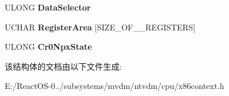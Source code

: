 \begin{DoxyCompactItemize}
U\+L\+O\+NG {\bfseries Data\+Selector}
\item 
\mbox{\label{struct___x87_f_l_o_a_t_i_n_g___s_a_v_e___a_r_e_a_a7ef3ca6bc7bd95fa032f0b3e6d0dd6bd}} 
U\+C\+H\+AR {\bfseries Register\+Area} \mbox{[}S\+I\+Z\+E\+\_\+\+O\+F\+\_\+\_\+\+R\+E\+G\+I\+S\+T\+E\+RS\mbox{]}
\item 
\mbox{\label{struct___x87_f_l_o_a_t_i_n_g___s_a_v_e___a_r_e_a_a5f188dba56de26be2fcdccbf6df14b03}} 
U\+L\+O\+NG {\bfseries Cr0\+Npx\+State}
\end{DoxyCompactItemize}


该结构体的文档由以下文件生成\+:\begin{DoxyCompactItemize}
\item 
E\+:/\+React\+O\+S-\/0../subsystems/mvdm/ntvdm/cpu/x86context.\+h\end{DoxyCompactItemize}
